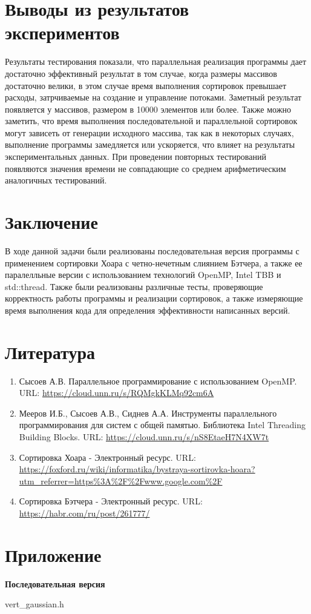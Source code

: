 \documentclass{report}
\begin{document}
\section*{Выводы из результатов экспериментов}
\par Результаты тестирования показали, что параллельная реализация программы дает достаточно эффективный результат в том случае, когда размеры массивов достаточно велики, в этом случае время выполнения сортировок превышает расходы, затрчиваемые на создание и управление потоками. Заметный результат появляется у массивов, размером в 10000 элементов или более. Также можно заметить, что время выполнения последовательной и параллельной сортировок могут зависеть от генерации исходного массива, так как в некоторых случаях, выполнение программы замедляется или ускоряется, что влияет на результаты экспериментальных данных. При проведении повторных тестирований появляются значения времени не совпадающие со среднем арифметическим аналогичных тестирований.
\newpage

\section*{Заключение}
\par В ходе данной задачи были реализованы последовательная версия программы с применением сортировки Хоара с четно-нечетным слиянием Бэтчера, а также ее паралелльные версии с использованием технологий OpenMP, Intel TBB и std::thread.
Также были реализованы различные тесты, проверяющие корректность работы программы и реализации сортировок, а также измеряющие время выполнения кода для определения эффективности написанных версий.
\newpage

\section*{Литература}
\begin{enumerate}
\item Сысоев А.В. Параллельное программирование с использованием OpenMP. URL: \newline
\url{https://cloud.unn.ru/s/RQMgkKLMq92cm6A}
\item Мееров И.Б., Сысоев А.В., Сиднев А.А. Инструменты параллельного программирования для систем с общей памятью. Библиотека Intel Threading Building Blocks. URL: \newline
\url{https://cloud.unn.ru/s/nS8EtaeH7N4XW7t}
\item Сортировка Хоара - Электронный ресурс. URL: \newline
\url{https://foxford.ru/wiki/informatika/bystraya-sortirovka-hoara?utm_referrer=https%3A%2F%2Fwww.google.com%2F}
\item Сортировка Бэтчера - Электронный ресурс. URL: \newline
\url{https://habr.com/ru/post/261777/}
\end{enumerate}
\newpage

\section*{Приложение}
\textbf{Последовательная версия}
\par vert\_gaussian.h
\begin{lstlisting}
\end{lstlisting}
\end{document}
